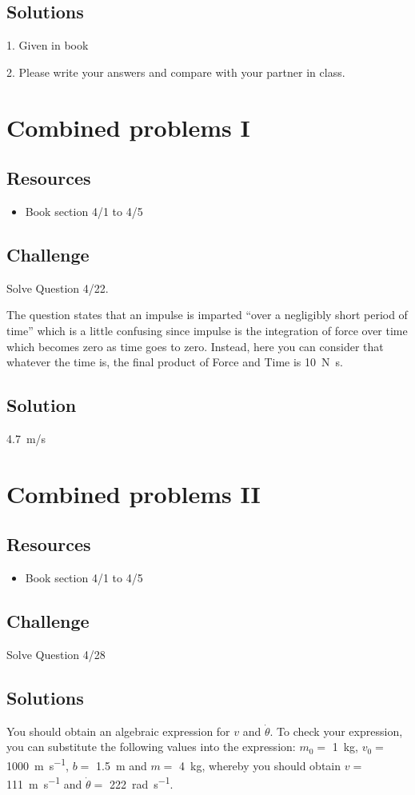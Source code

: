 \subsection*{Solutions}
1. Given in book

2. Please write your answers and compare with your partner in class.




\newpage
\section{Combined problems I}

\subsection*{Resources}
\begin{itemize}
    \item Book section 4/1 to 4/5
\end{itemize}

\subsection*{Challenge}
Solve Question 4/22.

The question states that an impulse is imparted ``over a negligibly short period of time'' which is a little confusing since impulse is the integration of force over time which becomes zero as time goes to zero. Instead, here you can consider that whatever the time is, the final product of Force and Time is \SI{10}{\newton\second}.

\subsection*{Solution}
\SI{4.7}{m/s}




\newpage
\section{Combined problems II}

\subsection*{Resources}
\begin{itemize}
    \item Book section 4/1 to 4/5
\end{itemize}

\subsection*{Challenge}
Solve Question 4/28

\subsection*{Solutions}
You should obtain an algebraic expression for $v$ and $\dot{\theta}$. To check your expression, you can substitute the following values into the expression:
$m_0=$ \SI{1}{\kg},
$v_0=$ \SI{1000}{\meter\per\second},
$b=$ \SI{1.5}{\meter} and
$m=$ \SI{4}{\kg}, whereby you should obtain
$v=$ \SI{111}{\meter\per\second} and
$\dot{\theta}=$ \SI{222}{\radian\per\second}.
